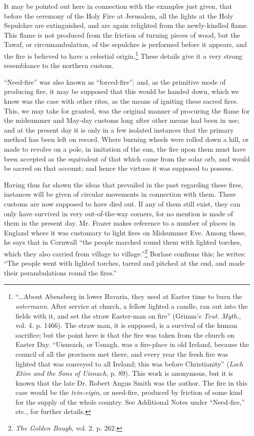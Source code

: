 \documentclass[a4paper, 11pt, oneside, polutonikogreek, english]{article}
\begin{document}
It may be pointed out here in connection with the examples just given, that before the ceremony of the Holy Fire at Jerusalem, all the lights at the Holy Sepulchre are extinguished, and are again relighted from the newly-kindled flame. This flame is not produced from the friction of turning pieces of wood, but the Tawaf, or circumambulation, of the sepulchre is performed before it appears, and the fire is believed to have a celestial origin.\footnote{``...About Abensberg in lower Bavaria, they used at Easter time to burn the \emph{ostermann}. After service at church, a fellow lighted a candle, ran out into the fields with it, and set the straw Easter-man on fire'' (Grimm's \emph{Teut. Myth.}, vol. 4. p. 1466). The straw man, it is supposed, is a survival of the human sacrifice; but the point here is that the fire was taken from the church on Easter Day. ``Uisneach, or Usnagh, was a fire-place in old Ireland, because the council of all the provinces met there, and every year the fresh fire was lighted that was conveyed to all Ireland; this was before Christianity'' (\emph{Loch Etive and the Sons of Uisnach}, p. 89). This work is anonymous, but it is known that the late Dr. Robert Angus Smith was the author. The fire in this case would be the \emph{tein-eigin}, or need-fire, produced by friction of some kind for the supply of the whole country. See Additional Notes under ``Need-fire,'' etc., for further details.} These details give it a very strong resemblance to the northern custom.

``Need-fire'' was also known as ``forced-fire''; and, as the primitive mode of producing fire, it may be supposed that this would be handed down, which we know was the case with other rites, as the means of igniting these sacred fires. This, we may take for granted, was the original manner of procuring the flame for the midsummer and May-day customs long after other means had been in use; and at the present day it is only in a few isolated instances that the primary method has been left on record. Where burning wheels were rolled down a hill, or made to revolve on a pole, in imitation of the sun, the fire upon them must have been accepted as the equivalent of that which came from the solar orb, and would be sacred on that account; and hence the virtues it was supposed to possess.

Having thus far shown the ideas that prevailed in the past regarding these fires, instances will be given of circular movements in connection with them. These customs are now supposed to have died out. If any of them still exist, they can only have survived in very out-of-the-way corners, for no mention is made of them in the present day. Mr. Frazer makes reference to a number of places in England where it was customary to light fires on Midsummer Eve. Among these, he says that in Cornwall ``the people marched round them with lighted torches, which they also carried from village to village.''\footnote{\emph{The Golden Bough}, vol. 2. p. 262.} Borlase confirms this; he writes: ``The people went with lighted torches, tarred and pitched at the end, and made their perambulations round the fires.''
\end{document}
